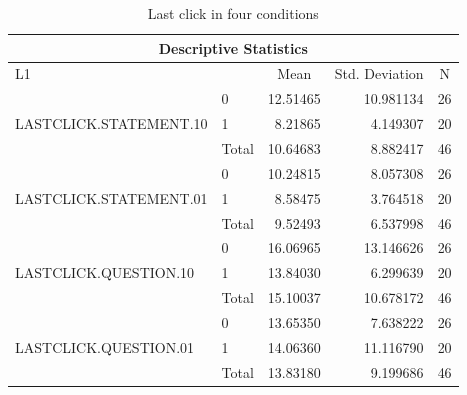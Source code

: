 \documentclass[a4paper]{article}
\begin{document}
\begin{table}[H]
\centering
\caption{Last click in four conditions}
\label{tab:descriptivelastclick}
\begin{tabular}{|l|l|r|r|r|} 
\hline
\multicolumn{5}{|c|}{Descriptive Statistics}                                                                                                \\ 
\hline
L1                                      &       & \multicolumn{1}{c|}{Mean} & \multicolumn{1}{c|}{Std. Deviation} & \multicolumn{1}{c|}{N}  \\ 
\hline
\multirow{3}{*}{LASTCLICK.STATEMENT.10} & 0     & 12.51465                  & 10.981134                           & 26                      \\ 
\cline{2-5}
                                        & 1     & 8.21865                   & 4.149307                            & 20                      \\ 
\cline{2-5}
                                        & Total & 10.64683                  & 8.882417                            & 46                      \\ 
\hline
\multirow{3}{*}{LASTCLICK.STATEMENT.01} & 0     & 10.24815                  & 8.057308                            & 26                      \\ 
\cline{2-5}
                                        & 1     & 8.58475                   & 3.764518                            & 20                      \\ 
\cline{2-5}
                                        & Total & 9.52493                   & 6.537998                            & 46                      \\ 
\hline
\multirow{3}{*}{LASTCLICK.QUESTION.10}  & 0     & 16.06965                  & 13.146626                           & 26                      \\ 
\cline{2-5}
                                        & 1     & 13.84030                  & 6.299639                            & 20                      \\ 
\cline{2-5}
                                        & Total & 15.10037                  & 10.678172                           & 46                      \\ 
\hline
\multirow{3}{*}{LASTCLICK.QUESTION.01}  & 0     & 13.65350                  & 7.638222                            & 26                      \\ 
\cline{2-5}
                                        & 1     & 14.06360                  & 11.116790                           & 20                      \\ 
\cline{2-5}
                                        & Total & 13.83180                  & 9.199686                            & 46                      \\
\hline
\end{tabular}
\end{table}
\end{document}
